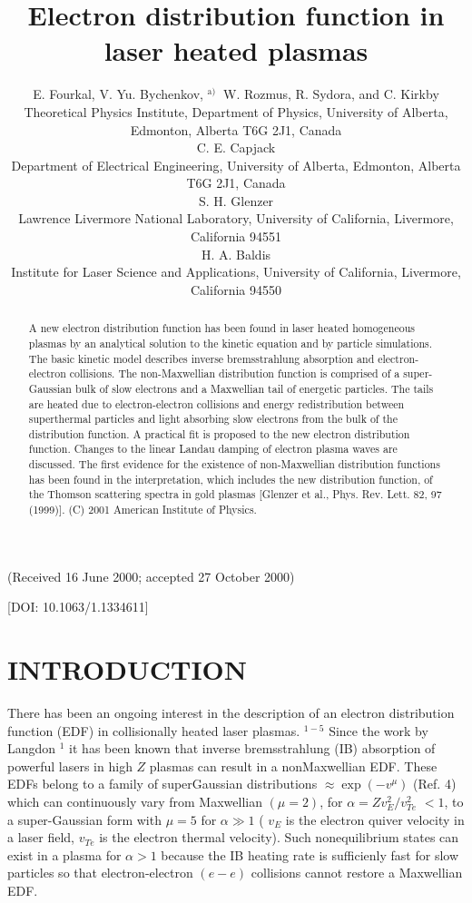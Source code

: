 \documentclass[10pt]{article}
\title{Electron distribution function in laser heated plasmas }
\author{E. Fourkal, V. Yu. Bychenkov, ${ }^{\text {a) }}$ W. Rozmus, R. Sydora, and C. Kirkby\\
Theoretical Physics Institute, Department of Physics, University of Alberta,\\
Edmonton, Alberta T6G 2J1, Canada\\
C. E. Capjack\\
Department of Electrical Engineering, University of Alberta, Edmonton, Alberta T6G 2J1, Canada\\
S. H. Glenzer\\
Lawrence Livermore National Laboratory, University of California, Livermore, California 94551\\
H. A. Baldis\\
Institute for Laser Science and Applications, University of California, Livermore, California 94550}
\date{}
\begin{document}
\maketitle
(Received 16 June 2000; accepted 27 October 2000)

\begin{abstract}
A new electron distribution function has been found in laser heated homogeneous plasmas by an analytical solution to the kinetic equation and by particle simulations. The basic kinetic model describes inverse bremsstrahlung absorption and electron-electron collisions. The non-Maxwellian distribution function is comprised of a super-Gaussian bulk of slow electrons and a Maxwellian tail of energetic particles. The tails are heated due to electron-electron collisions and energy redistribution between superthermal particles and light absorbing slow electrons from the bulk of the distribution function. A practical fit is proposed to the new electron distribution function. Changes to the linear Landau damping of electron plasma waves are discussed. The first evidence for the existence of non-Maxwellian distribution functions has been found in the interpretation, which includes the new distribution function, of the Thomson scattering spectra in gold plasmas [Glenzer et al., Phys. Rev. Lett. 82, 97 (1999)]. (C) 2001 American Institute of Physics.
\end{abstract}

[DOI: 10.1063/1.1334611]

\section{INTRODUCTION}
There has been an ongoing interest in the description of an electron distribution function (EDF) in collisionally heated laser plasmas. ${ }^{1-5}$ Since the work by Langdon ${ }^{1}$ it has been known that inverse bremsstrahlung (IB) absorption of powerful lasers in high $Z$ plasmas can result in a nonMaxwellian EDF. These EDFs belong to a family of superGaussian distributions $\approx \exp \left(-v^{\mu}\right)$ (Ref. 4) which can continuously vary from Maxwellian $(\mu=2)$, for $\alpha=Z v_{E}^{2} / v_{T e}^{2}$ $<1$, to a super-Gaussian form with $\mu=5$ for $\alpha \gg 1$ ( $v_{E}$ is the electron quiver velocity in a laser field, $v_{T e}$ is the electron thermal velocity). Such nonequilibrium states can exist in a plasma for $\alpha>1$ because the IB heating rate is sufficienly fast for slow particles so that electron-electron $(e-e)$ collisions cannot restore a Maxwellian EDF.
\end{document}

